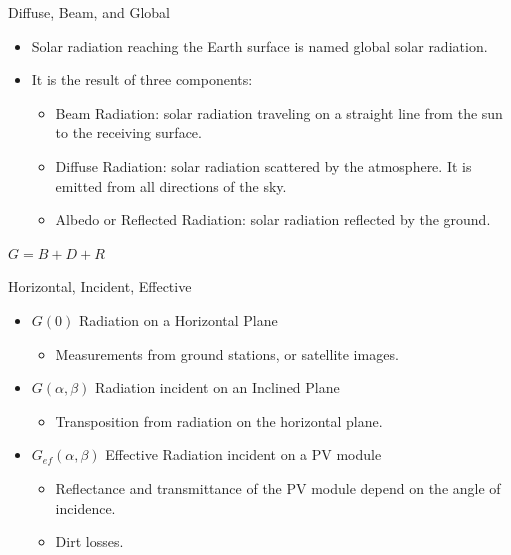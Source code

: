 \documentclass[xcolor={usenames,svgnames,dvipsnames}]{beamer}
\begin{document}
\begin{frame}[label={sec:org022c949}]{Diffuse, Beam, and Global}
\begin{itemize}
\item Solar radiation reaching the Earth surface is named \alert{global solar radiation}.
\item It is the result of three components:
\begin{itemize}
\item \alert{Beam Radiation}: solar radiation traveling on a straight line from the sun to the receiving surface.
\item \alert{Diffuse Radiation}: solar radiation scattered by the atmosphere. It is emitted from all directions of the sky.
\item \alert{Albedo or Reflected Radiation}: solar radiation reflected by the ground.
\end{itemize}
\end{itemize}

\begin{center}
\(G = B + D + R\)
\end{center}
\end{frame}

\begin{frame}[label={sec:org785f71c}]{Horizontal, Incident, Effective}
\begin{itemize}
\item \(G(0)\) \alert{Radiation on a Horizontal Plane} 
\begin{itemize}
\item Measurements from ground stations, or satellite images.
\end{itemize}
\item \(G(\alpha, \beta)\) \alert{Radiation incident on an Inclined Plane}
\begin{itemize}
\item Transposition from radiation on the horizontal plane.
\end{itemize}
\item \(G_{ef}(\alpha, \beta)\) \alert{Effective Radiation incident on a PV module}
\begin{itemize}
\item Reflectance and transmittance of the PV module depend on the angle of incidence.
\item Dirt losses.
\end{itemize}
\end{itemize}
\end{frame}
\end{document}
